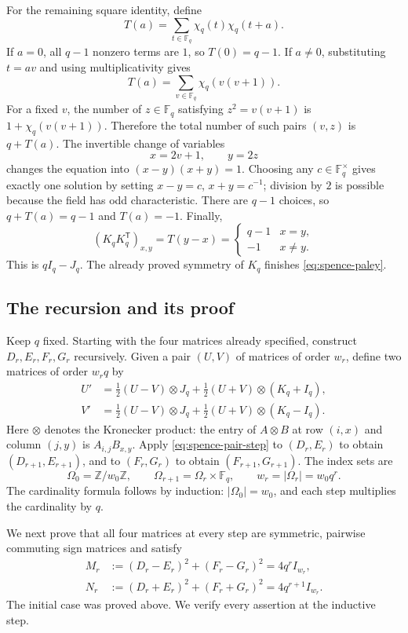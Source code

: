 \documentclass[10pt]{article}
\begin{document}
For the remaining square identity, define
\[
 T(a)=\sum_{t\in\mathbb F_q}\chi_q(t)\chi_q(t+a).
\]
If $a=0$, all $q-1$ nonzero terms are $1$, so $T(0)=q-1$.
If $a\ne0$, substituting $t=av$ and using multiplicativity gives
\[
 T(a)=\sum_{v\in\mathbb F_q}\chi_q(v(v+1)).
\]
For a fixed $v$, the number of $z\in\mathbb F_q$ satisfying
$z^2=v(v+1)$ is $1+\chi_q(v(v+1))$. Therefore the total number of such
pairs $(v,z)$ is $q+T(a)$. The invertible change of variables
\[
 x=2v+1,\qquad y=2z
\]
changes the equation into $(x-y)(x+y)=1$. Choosing any
$c\in\mathbb F_q^\times$ gives exactly one solution by setting
$x-y=c$, $x+y=c^{-1}$; division by $2$ is possible because the field has
odd characteristic. There are $q-1$ choices, so $q+T(a)=q-1$ and
$T(a)=-1$. Finally,
\[
 (K_qK_q^{\mathsf T})_{x,y}=T(y-x)
 =\begin{cases}q-1&x=y,\\-1&x\ne y.\end{cases}
\]
This is $qI_q-J_q$. The already proved symmetry of $K_q$ finishes
\eqref{eq:spence-paley}.

\subsection{The recursion and its proof}

Keep $q$ fixed. Starting with the four matrices already specified,
construct $D_r,E_r,F_r,G_r$ recursively. Given a pair $(U,V)$ of matrices
of order $w_r$, define two matrices of order $w_rq$ by
\begin{equation}\label{eq:spence-pair-step}
 \begin{split}
 U'&=\tfrac12(U-V)\otimes J_q+
       \tfrac12(U+V)\otimes(K_q+I_q),\\
 V'&=\tfrac12(U-V)\otimes J_q+
       \tfrac12(U+V)\otimes(K_q-I_q).
 \end{split}
\end{equation}
Here $\otimes$ denotes the Kronecker product: the entry of $A\otimes B$
at row $(i,x)$ and column $(j,y)$ is $A_{i,j}B_{x,y}$.
Apply \eqref{eq:spence-pair-step} to $(D_r,E_r)$ to obtain
$(D_{r+1},E_{r+1})$, and to $(F_r,G_r)$ to obtain
$(F_{r+1},G_{r+1})$. The index sets are
\[
 \Omega_0=\mathbb Z/w_0\mathbb Z,\qquad
 \Omega_{r+1}=\Omega_r\times\mathbb F_q,
 \qquad w_r=|\Omega_r|=w_0q^r.
\]
The cardinality formula follows by induction: $|\Omega_0|=w_0$, and each
step multiplies the cardinality by $q$.

We next prove that all four matrices at every step are symmetric,
pairwise commuting sign matrices and satisfy
\begin{equation}\label{eq:spence-induction-norms}
 \begin{split}
 M_r&:=(D_r-E_r)^2+(F_r-G_r)^2=4q^rI_{w_r},\\
 N_r&:=(D_r+E_r)^2+(F_r+G_r)^2=4q^{r+1}I_{w_r}.
 \end{split}
\end{equation}
The initial case was proved above. We verify every assertion at the
inductive step.
\end{document}
